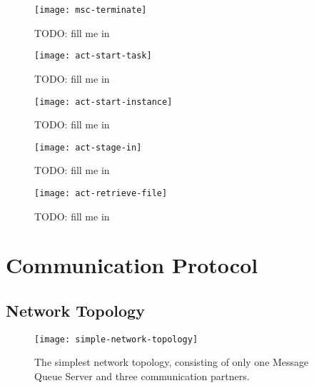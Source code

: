 \begin{figure}
  \begin{center}
    \texttt{[image: msc-terminate]}
  \end{center}
  \caption[MSC Terminate Task Request]{TODO: fill me in}
  \label{fig:msc-terminate}
\end{figure}

\begin{figure}
  \begin{center}
    \texttt{[image: act-start-task]}
  \end{center}
  \caption[Start Task Activity]{TODO: fill me in}
  \label{fig:act-start-task}
\end{figure}

\begin{figure}
  \begin{center}
    \texttt{[image: act-start-instance]}
  \end{center}
  \caption[Start Instance Activity]{TODO: fill me in}
  \label{fig:act-start-instance}
\end{figure}

\begin{figure}
  \begin{center}
    \texttt{[image: act-stage-in]}
  \end{center}
  \caption[Stage-In Activity]{TODO: fill me in}
  \label{fig:act-stage-in}
\end{figure}

\begin{figure}
  \begin{center}
    \texttt{[image: act-retrieve-file]}
  \end{center}
  \caption[File Retrieval Activity]{TODO: fill me in}
  \label{fig:act-retrieve-file}
\end{figure}


\section{Communication Protocol}
\label{cha:comm-prot}

\subsection{Network Topology}
\label{sec:network-topology}

\begin{figure}
  \begin{center}
    \texttt{[image: simple-network-topology]}
  \end{center}
  \caption[Network  Topology   (simple)]{The  simplest  network  topology,
    consisting of  only one Message  Queue Server and  three communication
    partners.}
  \label{fig:simple-net-top}
\end{figure}

